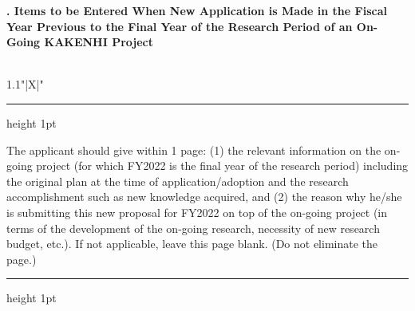 \documentclass[8pt]{extarticle}
\makeatletter
\newcommand{\thickhline}{%
	\noalign {\ifnum 0=`}\fi \hrule height 1pt
	\futurelet \reserved@a \@xhline
}
\makeatother
\begin{document}
	
\noindent\textbf{\fontsize{12}{12}. Items to be Entered When New Application is Made in the Fiscal Year Previous to the Final Year of the Research Period of an On-Going KAKENHI Project}\\
\indent {}\\
\begin{tabularx}{1.1\linewidth}{"|X|"}
	\thickhline
	The applicant should give within 1 page: (1) the relevant information on the on-going project (for which FY2022 is the final year of the research period) including the original plan at the time of application/adoption and the research accomplishment such as new knowledge acquired, and (2) the reason why he/she is submitting this new proposal for FY2022 on top of the on-going project (in terms of the development of the on-going research, necessity of new research budget, etc.). If not applicable, leave this page blank. (Do not eliminate the page.) 
	\\
	\thickhline
\end{tabularx}
\end{document}
